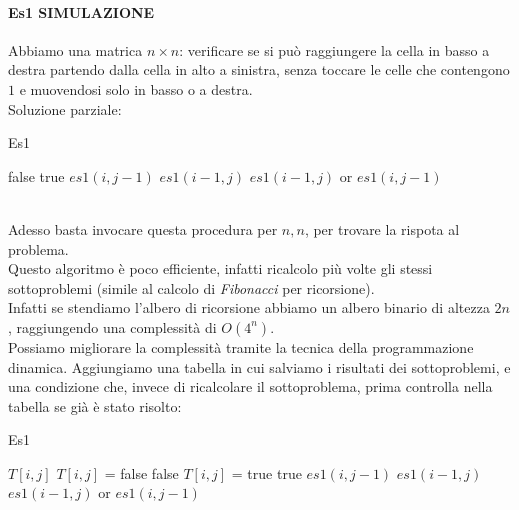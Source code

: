 \paragraph{Es1 SIMULAZIONE}
Abbiamo una matrica $n\times n$: verificare se si può raggiungere la cella in basso a destra partendo dalla cella in alto a sinistra, senza toccare le celle che contengono $1$ e muovendosi solo in basso o a destra. \\
Soluzione parziale:
\begin{algorithm}
	\caption{Es1}\label{alg:es1-sim}
	\begin{algorithmic}[1]
				\State \Return false
			\EndIf
				\State \Return true
			\EndIf
				\State \Return $es1(i,j-1)$
			\EndIf
				\State \Return $es1(i-1,j)$
			\EndIf
			\State \Return $es1(i-1,j)$ or $es1(i,j-1)$
		\EndFunction
	\end{algorithmic}
\end{algorithm} \\ \hfill
Adesso basta invocare questa procedura per $n,n$, per trovare la rispota al problema. \\
Questo algoritmo è poco efficiente, infatti ricalcolo più volte gli stessi sottoproblemi (simile al calcolo di \textit{Fibonacci} per ricorsione). \\
Infatti se stendiamo l'albero di ricorsione abbiamo un albero binario di altezza $2n$, raggiungendo una complessità di $O(4^n)$. \\
Possiamo migliorare la complessità tramite la tecnica della programmazione dinamica. Aggiungiamo una tabella in cui salviamo i risultati dei sottoproblemi, e una condizione che, invece di ricalcolare il sottoproblema, prima controlla nella tabella se già è stato risolto:
\begin{algorithm}
	\caption{Es1}\label{alg:es1-sim-2}
	\begin{algorithmic}[1]
				\State \Return $T[i,j]$
			\EndIf
				\State $T[i,j]$ = false
				\State \Return false
			\EndIf
				\State $T[i,j]$ = true
				\State \Return true
			\EndIf
				\State \Return $es1(i,j-1)$
			\EndIf
				\State \Return $es1(i-1,j)$
			\EndIf
			\State \Return $es1(i-1,j)$ or $es1(i,j-1)$
		\EndFunction
	\end{algorithmic}
\end{algorithm} \\ \hfill
